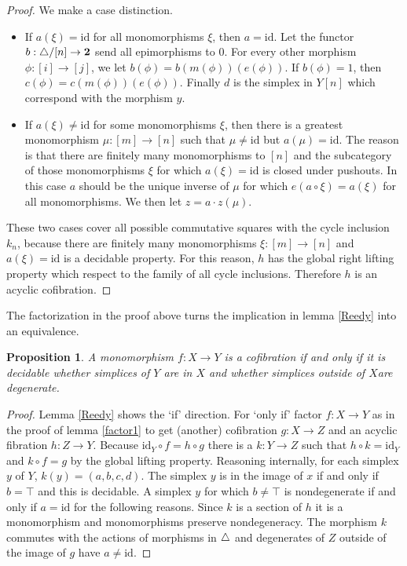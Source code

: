 \documentclass{amsart}
\theoremstyle{plain}
\newtheorem{prop}[theorem]{Proposition}
\theoremstyle{definition}
\newcommand\id{\mathrm{id}}
\newcommand\sier{{\mathbf 2}}
\begin{document}
\begin{proof}
We make a case distinction.
\begin{itemize}
\item If $a(\xi)=\id$ for all monomorphisms $\xi$, then $a=\id$. Let the functor $b:\simcat/[n]\to \sier$ send all epimorphisms to $0$. For every other morphism $\phi:[i]\to [j]$, we let $b(\phi) = b(m(\phi))(e(\phi))$. If $b(\phi)=1$, then $c(\phi) = c(m(\phi))(e(\phi))$. Finally $d$ is the simplex in $Y[n]$ which correspond with the morphism $y$.

\item If $a(\xi)\neq \id$ for some monomorphisms $\xi$, then there is a greatest monomorphism $\mu:[m]\to[n]$ such that $\mu\neq \id$ but $a(\mu)=\id$. The reason is that there are finitely many monomorphisms to $[n]$ and the subcategory of those monomorphisms $\xi$ for which $a(\xi)=\id$ is closed under pushouts. In this case $a$ should be the unique inverse of $\mu$ for which $e(a\circ \xi) = a(\xi)$ for all monomorphisms. We then let $z = a\cdot z(\mu)$.
\end{itemize}

These two cases cover all possible commutative squares with the cycle inclusion $k_n$, because there are finitely many monomorphisms $\xi:[m]\to [n]$ and $a(\xi) = \id$ is a decidable property. For this reason, $h$ has the global right lifting property which respect to the family of all cycle inclusions. Therefore $h$ is an acyclic cofibration.
\end{proof} %


The factorization in the proof above turns the implication in lemma \ref{Reedy} into an equivalence.

\begin{prop} A monomorphism $f:X\to Y$ is a cofibration if and only if it is decidable whether simplices of $Y$ are in $X$ and whether simplices outside of $X$are degenerate. \label{charcof} \end{prop}

\begin{proof} Lemma \ref{Reedy} shows the `if' direction. For `only if' factor $f:X\to Y$ as in the proof of lemma \ref{factor1} to get (another) cofibration $g:X\to Z$ and an acyclic fibration $h:Z\to Y$. Because $\id_Y\circ f = h\circ g$ there is a $k:Y\to Z$ such that $h\circ k = \id_Y$ and $k\circ f = g$ by the global lifting property. Reasoning internally, for each simplex $y$ of $Y$, $k(y)=(a,b,c,d)$. The simplex $y$ is in the image of $x$ if and only if $b=\top$ and this is decidable. A simplex $y$ for which $b\neq \top$ is nondegenerate if and only if $a=\id$ for the following reasons. Since $k$ is a section of $h$ it is a monomorphism and monomorphisms preserve nondegeneracy. The morphism $k$ commutes with the actions of morphisms in ${\mathord{\triangle}}$ and degenerates of $Z$ outside of the image of $g$ have $a\neq\id$.
\end{proof}
\end{document}
